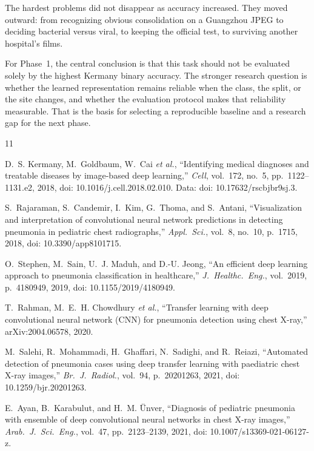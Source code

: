 \documentclass[11pt,a4paper]{article}
\begin{document}
The hardest problems did not disappear as accuracy increased. They moved outward: from recognizing obvious consolidation on a Guangzhou JPEG to deciding bacterial versus viral, to keeping the official test, to surviving another hospital's films.

For Phase~1, the central conclusion is that this task should not be evaluated solely by the highest Kermany binary accuracy. The stronger research question is whether the learned representation remains reliable when the class, the split, or the site changes, and whether the evaluation protocol makes that reliability measurable. That is the basis for selecting a reproducible baseline and a research gap for the next phase.

\begin{thebibliography}{11}

D.~S. Kermany, M.~Goldbaum, W.~Cai \textit{et al.}, ``Identifying medical diagnoses and treatable diseases by image-based deep learning,'' \textit{Cell}, vol.~172, no.~5, pp.~1122--1131.e2, 2018, doi: 10.1016/j.cell.2018.02.010. Data: doi: 10.17632/rscbjbr9sj.3.

S.~Rajaraman, S.~Candemir, I.~Kim, G.~Thoma, and S.~Antani, ``Visualization and interpretation of convolutional neural network predictions in detecting pneumonia in pediatric chest radiographs,'' \textit{Appl.\ Sci.}, vol.~8, no.~10, p.~1715, 2018, doi: 10.3390/app8101715.

O.~Stephen, M.~Sain, U.~J. Maduh, and D.-U. Jeong, ``An efficient deep learning approach to pneumonia classification in healthcare,'' \textit{J.\ Healthc.\ Eng.}, vol.~2019, p.~4180949, 2019, doi: 10.1155/2019/4180949.

T.~Rahman, M.~E.~H. Chowdhury \textit{et al.}, ``Transfer learning with deep convolutional neural network (CNN) for pneumonia detection using chest X-ray,'' arXiv:2004.06578, 2020.

M.~Salehi, R.~Mohammadi, H.~Ghaffari, N.~Sadighi, and R.~Reiazi, ``Automated detection of pneumonia cases using deep transfer learning with paediatric chest X-ray images,'' \textit{Br.\ J.\ Radiol.}, vol.~94, p.~20201263, 2021, doi: 10.1259/bjr.20201263.

E.~Ayan, B.~Karabulut, and H.~M. \"Unver, ``Diagnosis of pediatric pneumonia with ensemble of deep convolutional neural networks in chest X-ray images,'' \textit{Arab.\ J.\ Sci.\ Eng.}, vol.~47, pp.~2123--2139, 2021, doi: 10.1007/s13369-021-06127-z.


\end{thebibliography}
\end{document}
